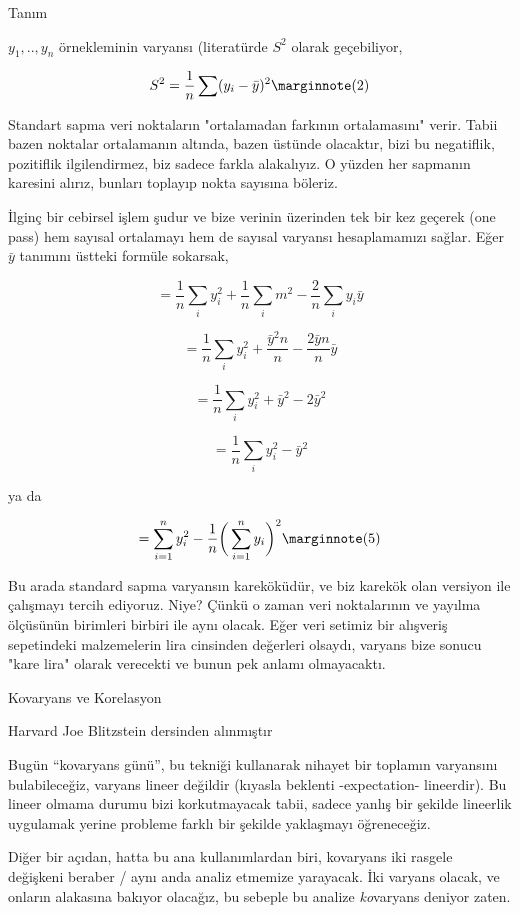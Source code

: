 \documentclass[12pt,fleqn]{article}\usepackage{../../common}
\begin{document}
Tanım

$y_1,..,y_n$ örnekleminin varyansı (literatürde $S^2$ olarak geçebiliyor,

$$ 
S^2 = 
\frac{1}{n} \sum (y_i - \bar{y})^2
\mlabel{2}
$$

Standart sapma veri noktaların "ortalamadan farkının ortalamasını"
verir. Tabii bazen noktalar ortalamanın altında, bazen üstünde olacaktır,
bizi bu negatiflik, pozitiflik ilgilendirmez, biz sadece farkla
alakalıyız. O yüzden her sapmanın karesini alırız, bunları toplayıp nokta
sayısına böleriz. 

İlginç bir cebirsel işlem şudur ve bize verinin üzerinden tek bir kez
geçerek (one pass) hem sayısal ortalamayı hem de sayısal varyansı
hesaplamamızı sağlar. Eğer $\bar{y}$ tanımını üstteki formüle sokarsak,

$$ = \frac{ 1}{n} \sum_i y_i^2 + \frac{ 1}{n} \sum_i m^2 - \frac{ 2}{n} \sum_i y_i\bar{y}  $$

$$ = \frac{ 1}{n} \sum_i y_i^2 + \frac{ \bar{y}^2n}{n} - \frac{ 2\bar{y}n}{n}\bar{y} $$

$$ = \frac{ 1}{n} \sum_i y_i^2 +  \bar{y}^2 - 2\bar{y}^2 $$

$$ = \frac{ 1}{n} \sum_i y_i^2 - \bar{y}^2 $$

ya da 

$$ = \sum _{i=1}^{n} y_i^2 - \frac{1}{n} \bigg( \sum _{i=1}^{n} y_i \bigg)^2  
\mlabel{5}
$$

Bu arada standard sapma varyansın kareköküdür, ve biz karekök olan versiyon
ile çalışmayı tercih ediyoruz. Niye? Çünkü o zaman veri noktalarının ve
yayılma ölçüsünün birimleri birbiri ile aynı olacak. Eğer veri setimiz bir
alışveriş sepetindeki malzemelerin lira cinsinden değerleri olsaydı,
varyans bize sonucu "kare lira" olarak verecekti ve bunun pek anlamı
olmayacaktı.

Kovaryans ve Korelasyon

Harvard Joe Blitzstein dersinden alınmıştır

Bugün ``kovaryans günü'', bu tekniği kullanarak nihayet bir toplamın
varyansını bulabileceğiz, varyans lineer değildir (kıyasla beklenti
-expectation- lineerdir). Bu lineer olmama durumu bizi korkutmayacak tabii,
sadece yanlış bir şekilde lineerlik uygulamak yerine probleme farklı bir
şekilde yaklaşmayı öğreneceğiz. 

Diğer bir açıdan, hatta bu ana kullanımlardan biri, kovaryans iki rasgele
değişkeni beraber / aynı anda analiz etmemize yarayacak. İki varyans
olacak, ve onların alakasına bakıyor olacağız, bu sebeple bu analize {\em
  ko}varyans deniyor zaten. 
\end{document}
